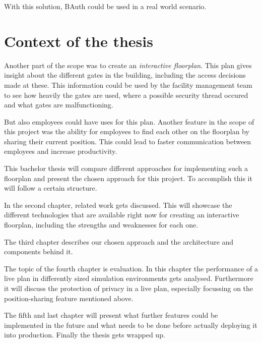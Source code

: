 With this solution, BAuth could be used in a real world scenario.

\section{Context of the thesis}
\label{Context of the thesis}

Another part of the scope was to create an \emph{interactive floorplan}. This plan gives insight about the different gates in the building, including the access decisions made at these. This information could be used by the facility management team to see how heavily the gates are used, where a possible security thread occured and what gates are malfunctioning. 

But also employees could have uses for this plan. Another feature in the scope of this project was the ability for employees to find each other on the floorplan by sharing their current position. This could lead to faster communication between employees and increase productivity.

This bachelor thesis will compare different approaches for implementing such a floorplan and present the chosen approach for this project. To accomplish this it will follow a certain structure. 

In the second chapter, related work gets discussed. This will showcase the different technologies that are available right now for creating an interactive floorplan, including the strengths and weaknesses for each one.

The third chapter describes our chosen approach and the architecture and components behind it.

The topic of the fourth chapter is evaluation. In this chapter the performance of a live plan in differently sized simulation environments gets analysed. Furthermore it will discuss the protection of privacy in a live plan, especially focussing on the position-sharing feature mentioned above.

The fifth and last chapter will present what further features could be implemented in the future and what needs to be done before actually deploying it into production. Finally the thesis gets wrapped up.